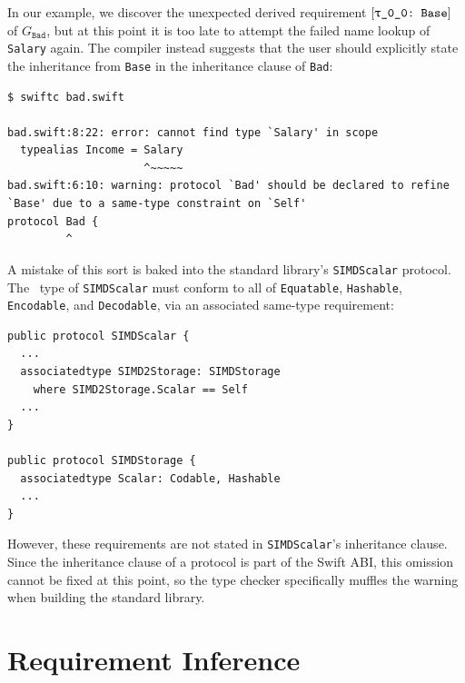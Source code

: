 \documentclass[../generics]{subfiles}
\begin{document}
In our example, we discover the unexpected derived requirement $\ConfReq{\ttgp{0}{0}}{Base}$ of $G_\texttt{Bad}$, but at this point it is too late to attempt the failed name lookup of \texttt{Salary} again. The compiler instead suggests that the user should explicitly state the inheritance from \texttt{Base} in the inheritance clause of \texttt{Bad}:
\begin{Verbatim}
$ swiftc bad.swift

bad.swift:8:22: error: cannot find type `Salary' in scope
  typealias Income = Salary
                     ^~~~~~
bad.swift:6:10: warning: protocol `Bad' should be declared to refine
`Base' due to a same-type constraint on `Self'
protocol Bad {
         ^
\end{Verbatim}

A mistake of this sort is baked into the standard library's \texttt{SIMDScalar} protocol. The \tSelf\ type of \texttt{SIMDScalar} must conform to all of \texttt{Equatable}, \texttt{Hashable}, \texttt{Encodable}, and \texttt{Decodable}, via an associated same-type requirement:
\begin{Verbatim}
public protocol SIMDScalar {
  ...
  associatedtype SIMD2Storage: SIMDStorage
    where SIMD2Storage.Scalar == Self
  ...
}

public protocol SIMDStorage {
  associatedtype Scalar: Codable, Hashable
  ...
}
\end{Verbatim}
However, these requirements are not stated in \texttt{SIMDScalar}'s inheritance clause. Since the inheritance clause of a protocol is part of the Swift ABI, this omission cannot be fixed at this point, so the type checker specifically muffles the warning when building the standard library.

\section{Requirement Inference}\label{requirementinference}
\end{document}
